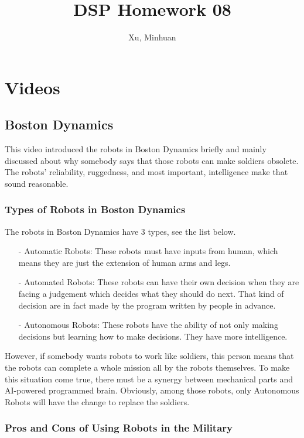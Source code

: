\documentclass{article}
\begin{document}
\title{DSP Homework 08}
\author{Xu, Minhuan}
\maketitle
\tableofcontents
\begin{abstract}

\end{abstract}

\section{Videos}
\subsection{Boston Dynamics}
This video introduced the robots in Boston Dynamics briefly and mainly discussed about why somebody says that those robots can make soldiers obsolete. The robots' reliability, ruggedness, and most important, intelligence make that sound reasonable.

\subsubsection{Types of Robots in Boston Dynamics}

The robots in Boston Dynamics have 3 types, see the list below.
\begin{enumerate}
	\item[-] Automatic Robots: These robots must have inputs from human, which means they are just the extension of human arms and legs.
	\item[-] Automated Robots: These robots can have their own decision when they are facing a judgement which decides what they should do next. That kind of decision are in fact made by the program written by people in advance.
	\item[-] Autonomous Robots: These robots have the ability of not only making decisions but learning how to make decisions. They have more intelligence.
\end{enumerate}

However, if somebody wants robots to work like soldiers, this person means that the robots can complete a whole mission all by the robots themselves. To make this situation come true, there must be a synergy between mechanical parts and AI-powered programmed brain. Obviously, among those robots, only Autonomous Robots will have the change to replace the soldiers.

\subsubsection{Pros and Cons of Using Robots in the Military}
\end{document}
